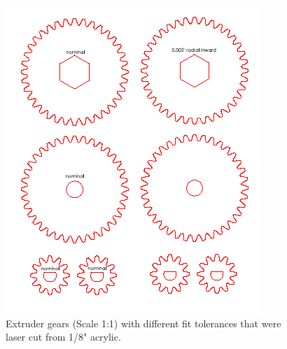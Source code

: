 


\begin{figure}[h!]
\centering
\includegraphics[scale=1]{./figures/Extruder Gears}
\caption{Extruder gears (Scale 1:1) with different fit tolerances that were laser cut from 1/8" acrylic.}
\label{fig:Extruder Gears}
\end{figure}




